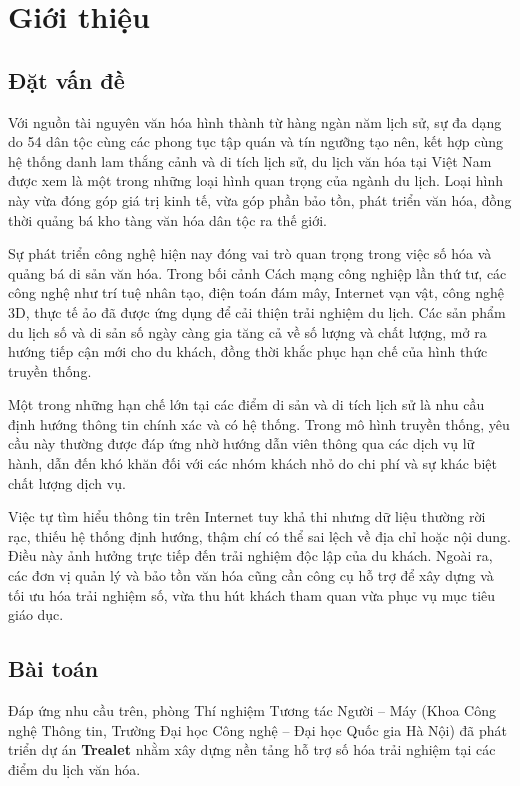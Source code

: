 \chapter{Giới thiệu}

\section{Đặt vấn đề}

Với nguồn tài nguyên văn hóa hình thành từ hàng ngàn năm lịch sử, sự đa dạng do 54 dân tộc cùng các phong tục tập quán và tín ngưỡng tạo nên, kết hợp cùng hệ thống danh lam thắng cảnh và di tích lịch sử, du lịch văn hóa tại Việt Nam được xem là một trong những loại hình quan trọng của ngành du lịch. Loại hình này vừa đóng góp giá trị kinh tế, vừa góp phần bảo tồn, phát triển văn hóa, đồng thời quảng bá kho tàng văn hóa dân tộc ra thế giới.  

Sự phát triển công nghệ hiện nay đóng vai trò quan trọng trong việc số hóa và quảng bá di sản văn hóa. Trong bối cảnh Cách mạng công nghiệp lần thứ tư, các công nghệ như trí tuệ nhân tạo, điện toán đám mây, Internet vạn vật, công nghệ 3D, thực tế ảo đã được ứng dụng để cải thiện trải nghiệm du lịch. Các sản phẩm du lịch số và di sản số ngày càng gia tăng cả về số lượng và chất lượng, mở ra hướng tiếp cận mới cho du khách, đồng thời khắc phục hạn chế của hình thức truyền thống.  

Một trong những hạn chế lớn tại các điểm di sản và di tích lịch sử là nhu cầu định hướng thông tin chính xác và có hệ thống. Trong mô hình truyền thống, yêu cầu này thường được đáp ứng nhờ hướng dẫn viên thông qua các dịch vụ lữ hành, dẫn đến khó khăn đối với các nhóm khách nhỏ do chi phí và sự khác biệt chất lượng dịch vụ.  

Việc tự tìm hiểu thông tin trên Internet tuy khả thi nhưng dữ liệu thường rời rạc, thiếu hệ thống định hướng, thậm chí có thể sai lệch về địa chỉ hoặc nội dung. Điều này ảnh hưởng trực tiếp đến trải nghiệm độc lập của du khách. Ngoài ra, các đơn vị quản lý và bảo tồn văn hóa cũng cần công cụ hỗ trợ để xây dựng và tối ưu hóa trải nghiệm số, vừa thu hút khách tham quan vừa phục vụ mục tiêu giáo dục.  

\section{Bài toán}

Đáp ứng nhu cầu trên, phòng Thí nghiệm Tương tác Người – Máy (Khoa Công nghệ Thông tin, Trường Đại học Công nghệ – Đại học Quốc gia Hà Nội) đã phát triển dự án \textbf{Trealet} nhằm xây dựng nền tảng hỗ trợ số hóa trải nghiệm tại các điểm du lịch văn hóa.  

